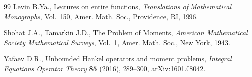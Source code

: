 \documentclass[11pt]{article}
\numberwithin{equation}{section}
\begin{document}
\begin{thebibliography}{99}
Levin B.Ya., Lectures on entire functions, \textit{Translations of Mathematical
 Monographs}, Vol.~150, Amer. Math. Soc., Providence, RI, 1996.

Shohat J.A., Tamarkin J.D., The {P}roblem of {M}oments, \textit{American
 Mathematical Society Mathematical Surveys}, Vol.~1, Amer. Math. Soc., New
 York, 1943.

Yafaev D.R., Unbounded {H}ankel operators and moment problems, \href{https://doi.org/10.1007/s00020-016-2289-y}{\textit{Integral
 Equations Operator Theory}} \textbf{85} (2016), 289--300, \href{https://arxiv.org/abs/1601.08042}{arXiv:1601.08042}.

\end{thebibliography}
\end{document}
